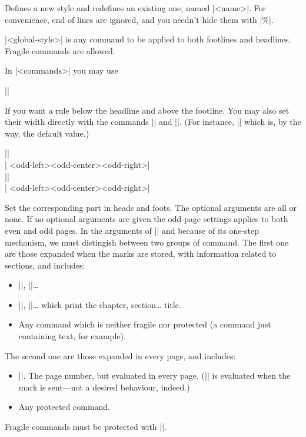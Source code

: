 \documentclass{ltxguide}
\begin{document}
Defines a new style and redefines an existing one, named |<name>|.  For 
convenience, end of lines are ignored, and you needn't hide them with 
|\%|.

|<global-style>| is any command to be applied to both footlines and 
headlines. Fragile commands are allowed.

In |<commands>| you may use
\begin{decl}
|\headrule \footrule|
\end{decl}

If you want a rule below the headline and above the footline.  You may 
also set their width directly with the commands |\setheadrule| and 
|\setfootrule|. (For instance, |\setheadrule{.4pt}| which is,
by the way, the default value.)

\begin{decl}
||\\
|        {<odd-left>}{<odd-center>}{<odd-right>}|\\
||\\
|        {<odd-left>}{<odd-center>}{<odd-right>}|
\end{decl}

Set the corresponding part in heads and foots.  The optional arguments 
are all or none.  If no optional arguments are given the odd-page 
settings applies to both even and odd pages.  In the arguments of 
|\sethead| and because of its one-step mechanism, we must distingish 
between two groups of command. The first one are those expanded when 
the marks are stored, with information related to sections, and 
includes:
\begin{itemize}
\item |\thechapter|, |\thesection|\dots{}
\item |\chaptertitle|, |\sectiontitle|\dots{} which print the chapter, 
section\dots{} title.
\item Any command which 
is neither fragile nor protected (a command just containing text, for 
example).
\end{itemize}
The second one are those expanded in every page, and includes:
\begin{itemize}
\item |\usepage|.  The 
page number, but evaluated in every page.  (|\thepage| is evaluated 
when the mark is sent---not a desired behaviour, indeed.)
\item Any protected command.
\end{itemize}
Fragile commands must be protected with |\protect|.
\end{document}
